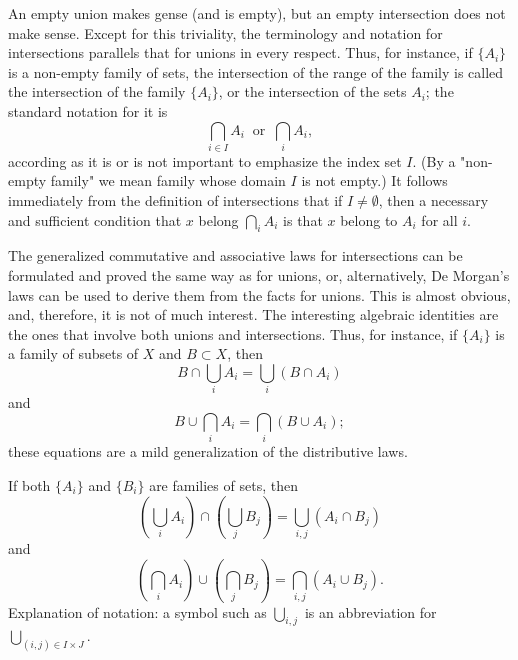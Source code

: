 An empty union makes gense (and is empty), but an empty intersection does not make sense. Except for this triviality, the terminology and notation for intersections parallels that for unions in every respect. Thus, for instance, if $\{ A_{i} \}$ is a non-empty family of sets, the intersection of the range of the family is called the intersection of the family $\{ A_{i} \}$, or the intersection of the sets $A_{i}$; the standard notation for it is 
\begin{equation*}
\bigcap_{i \in I}A_{i} \: \text{ or } \: \bigcap_{i}A_{i},
\end{equation*}
according as it is or is not important to emphasize the index set $I$. (By a "non-empty family" we mean family whose domain $I$ is not empty.) It follows immediately from the definition of intersections that if $I \neq \emptyset$, then a necessary and sufficient condition that $x$ belong $\bigcap_{i}A_{i}$ is that $x$ belong to $A_{i}$ for all $i$. 

The generalized commutative and associative laws for intersections can be formulated and proved the same way as for unions, or, alternatively, De Morgan's laws can be used to derive them from the facts for unions. This is almost obvious, and, therefore, it is not of much interest. The interesting algebraic identities are the ones that involve both unions and intersections. Thus, for instance, if $\{ A_{i} \}$ is a family of subsets of $X$ and $B \subset X$, then 
\begin{equation*}
B \cap \bigcup_{i}A_{i} = \bigcup_{i}(B \cap A_{i})
\end{equation*}
and
\begin{equation*}
B \cup \bigcap_{i}A_{i} = \bigcap_{i}(B \cup A_{i});
\end{equation*}
these equations are a mild generalization of the distributive laws.

\begin{exercise} If both $\{ A_{i} \}$ and $\{ B_{i} \}$ are families of sets, then 
\begin{equation*}
(\bigcup_{i}A_{i}) \cap (\bigcup_{j}B_{j}) = \bigcup_{i,j}(A_{i} \cap B_{j}) 
\end{equation*}
and
\begin{equation*}
(\bigcap_{i}A_{i}) \cup (\bigcap_{j}B_{j}) = \bigcap_{i,j}(A_{i} \cup B_{j}). 
\end{equation*}
Explanation of notation: a symbol such as $\bigcup_{i,j}$ is an abbreviation for $\bigcup_{(i,j) \in I \times J}$.
\end{exercise}

